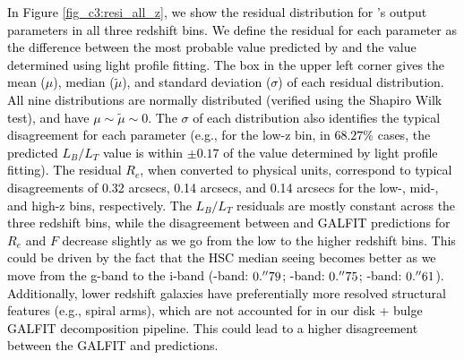 \textcolor{black}{In Figure \ref{fig_c3:resi_all_z}, we show the residual distribution for \gampen{}'s output parameters in all three redshift bins. We define the residual for each parameter as the difference between the most probable value predicted by \gampen{} and the value determined using light profile fitting. The box in the upper left corner gives 
the mean ($\mu$), median ($\tilde{\mu}$), and standard deviation ($\sigma$) of each residual distribution. All nine distributions are normally distributed (verified using the Shapiro Wilk test), and have $\mu \sim \tilde{\mu} \sim 0$. The $\sigma$ of each distribution also identifies the typical disagreement for each parameter (e.g., for the low-z bin, in $68.27\%$ cases, the predicted $L_B/L_T$ value is within $\pm0.17$ of the value determined by light profile fitting). The residual $R_e$, when converted to physical units, correspond to typical disagreements of 0.32 arcsecs, 0.14 arcsecs, and 0.14 arcsecs for the low-, mid-, and high-z bins, respectively. The $L_B/L_T$ residuals are mostly constant across the three redshift bins, while the disagreement between \gampen{} and GALFIT predictions for $R_e$ and $F$ decrease slightly as we go from the low to the higher redshift bins. This could be driven by the fact that the HSC median seeing becomes better as we move from the g-band to the i-band (\gb{}-band: $0.\mbox{$^{\prime\prime}$}79$; \rb{}-band: $0.\mbox{$^{\prime\prime}$}75$; \ib{}-band: $0.\mbox{$^{\prime\prime}$}61$). Additionally, lower redshift galaxies have preferentially more resolved structural features (e.g., spiral arms), which are not accounted for in our disk + bulge GALFIT decomposition pipeline. This could lead to a higher disagreement between the GALFIT and \gampen{} predictions.}  

